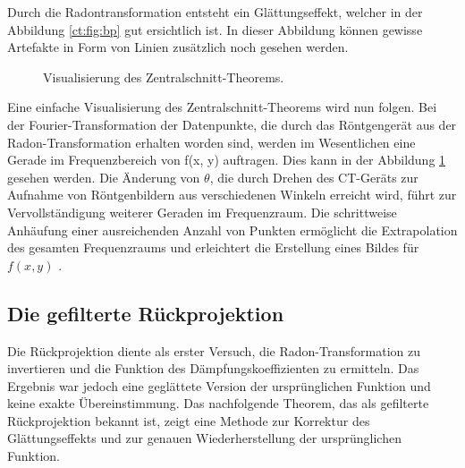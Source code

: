 Durch die Radontransformation entsteht ein Glättungseffekt, welcher in  der Abbildung \ref{ct:fig:bp} gut ersichtlich ist. In dieser Abbildung können gewisse Artefakte in Form von Linien zusätzlich noch gesehen werden.

\begin{figure}
	\centering
	\caption{Visualisierung des Zentralschnitt-Theorems.}
	\label{ct:img:central-slice}
\end{figure}
Eine einfache Visualisierung des Zentralschnitt-Theorems wird nun folgen. Bei der Fourier-Transformation der Datenpunkte, die durch das Röntgengerät aus der Radon-Transformation erhalten worden sind, werden im Wesentlichen eine Gerade im Frequenzbereich von f(x, y) auftragen. Dies kann in der Abbildung \ref{ct:img:central-slice} gesehen werden. 
Die Änderung von $\theta$, die durch Drehen des CT-Geräts zur Aufnahme von Röntgenbildern aus verschiedenen Winkeln erreicht wird, führt zur Vervollständigung weiterer Geraden im Frequenzraum. Die schrittweise Anhäufung einer ausreichenden Anzahl von Punkten ermöglicht die Extrapolation des gesamten Frequenzraums und erleichtert die Erstellung eines Bildes für $f(x, y)$ \cite{ct:condensate}.


\subsection{Die gefilterte Rückprojektion
	\label{ct:subsection:gefilterterueck}}
Die Rückprojektion diente als erster Versuch, die Radon-Transformation zu invertieren und die Funktion des Dämpfungskoeffizienten zu ermitteln. Das Ergebnis war jedoch eine geglättete Version der ursprünglichen Funktion und keine exakte Übereinstimmung. Das nachfolgende Theorem, das als gefilterte Rückprojektion bekannt ist, zeigt eine Methode zur Korrektur des Glättungseffekts und zur genauen Wiederherstellung der ursprünglichen Funktion.

